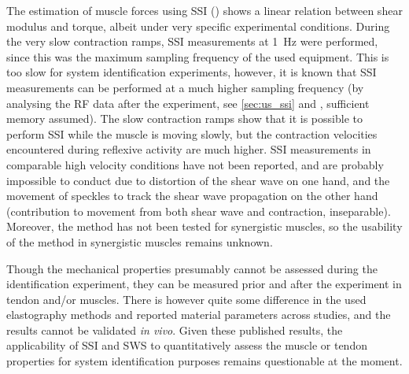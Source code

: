The estimation of muscle forces using SSI (\citet{bouillard_estimation_2011}) shows a linear relation between shear modulus and torque, albeit under very specific experimental conditions. During the very slow contraction ramps, SSI measurements at \SI{1}{\hertz} were performed, since this was the maximum sampling frequency of the used equipment. This is too slow for system identification experiments, however, it is known that SSI measurements can be performed at a much higher sampling frequency (by analysing the RF data after the experiment, see \autoref{sec:us_ssi} and \cite{bercoff_supersonic_2004}, sufficient memory assumed). The slow contraction ramps show that it is possible to perform SSI while the muscle is moving slowly, but the contraction velocities encountered during reflexive activity are much higher. SSI measurements in comparable high velocity conditions have not been reported, and are probably impossible to conduct due to distortion of the shear wave on one hand, and the movement of speckles to track the shear wave propagation on the other hand (contribution to movement from both shear wave and contraction, inseparable). Moreover, the method has not been tested for synergistic muscles, so the usability of the method in synergistic muscles remains unknown. 


Though the mechanical properties presumably cannot be assessed during the identification experiment, they can be measured prior and after the experiment in tendon and/or muscles. There is however quite some difference in the used elastography methods and reported material parameters across studies, and the results cannot be validated \textit{in vivo}. Given these published results, the applicability of SSI and SWS to quantitatively assess the muscle or tendon properties for system identification purposes remains questionable at the moment. 

